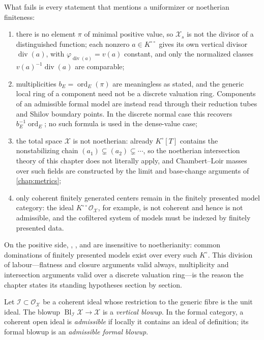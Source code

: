 \begin{example}
What fails is every statement that mentions a uniformizer or noetherian
finiteness:
\begin{enumerate}
\item there is no element $\pi$ of minimal positive value, so
  $\mathcal X_s$ is not the divisor of a distinguished function; each
  nonzero $a\in K^{\circ\circ}$ gives its own vertical divisor
  $\operatorname{div}(a)$, with $\varphi_{\operatorname{div}(a)}=v(a)$
  constant, and only the normalized classes
  $v(a)^{-1}\operatorname{div}(a)$ are comparable;
\item multiplicities $b_E=\operatorname{ord}_E(\pi)$ are meaningless as
  stated, and the generic local ring of a component need not be a discrete
  valuation ring.  Components of an admissible formal model are instead
  read through their reduction tubes and Shilov boundary points.  In the
  discrete normal case this recovers
  $b_E^{-1}\operatorname{ord}_E$; no such formula is used in the dense-value
  case;
\item the total space $\mathcal X$ is not noetherian: already
  $K^\circ[T]$ contains the nonstabilizing chain
  $(a_1)\subsetneq(a_2)\subsetneq\cdots$, so the noetherian intersection
  theory of this chapter does not literally apply, and Chambert--Loir
  masses over such fields are constructed by the limit and base-change
  arguments of \cref{chap:metrics};
\item only coherent finitely generated centers remain in the finitely
  presented model category: the ideal
  $K^{\circ\circ}\mathcal O_{\mathcal X}$, for example, is not coherent and
  hence is not admissible,
  and the cofiltered system of models must be indexed by finitely
  presented data.
\end{enumerate}
On the positive side, ,
, and
 are insensitive to
noetherianity: common dominations of finitely presented models exist over
every such $K^\circ$.  This division of labour---flatness and closure
arguments valid always, multiplicity and intersection arguments valid over
a discrete valuation ring---is the reason the chapter states its standing
hypotheses section by section.
\end{example}

\begin{definition}\label{def:vertical-admissible-blowup}
Let $\mathcal I\subset\mathcal O_{\mathcal X}$ be a coherent ideal whose
restriction to the generic fibre is the unit ideal. The blowup
$\operatorname{Bl}_{\mathcal I}\mathcal X\to\mathcal X$ is a
\emph{vertical blowup}. In the formal category, a coherent open ideal is
\emph{admissible} if locally it contains an ideal of definition; its formal
blowup is an \emph{admissible formal blowup}.
\end{definition}

